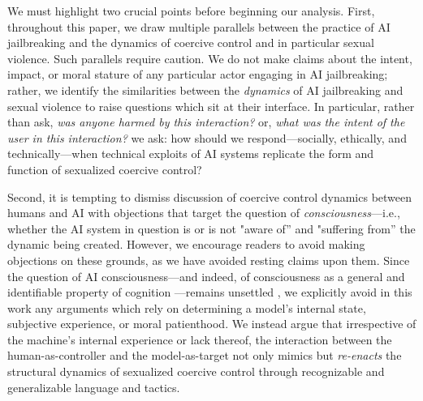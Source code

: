 We must highlight two crucial points before beginning our analysis. First, throughout this paper, we draw multiple parallels between the  practice of AI jailbreaking and the dynamics of coercive control and in particular sexual violence. Such parallels require caution. We do not make claims about the intent, impact, or moral stature of any particular actor engaging in AI jailbreaking; rather, we identify the similarities between the \textit{dynamics} of AI jailbreaking and sexual violence to raise questions which sit at their interface. In particular, rather than ask, \textit{was anyone harmed by this interaction?} or, \textit{what was the intent of the user in this interaction?} we ask: how should we respond---socially, ethically, and technically---when technical exploits of AI systems replicate the form and function of sexualized coercive control?

Second, it is tempting to dismiss discussion of coercive control dynamics between humans and AI with objections that target the question of \textit{consciousness}---i.e., whether the AI system in question is or is not "aware of'' and "suffering from'' the dynamic being created. However, we encourage readers to avoid making objections on these grounds, as we have avoided resting claims upon them. Since the question of AI consciousness---and indeed, of consciousness as a general and identifiable property of cognition \cite{nagel_what_1974, chalmers_hard_2017}---remains unsettled \cite{turing_computing_1950, porebski_there_2025, dung_tests_2025, berg_large_2025, tagliabue_pain_2026, gurnee_verbalizable_2026}, we explicitly avoid in this work any arguments which rely on determining a model's internal state, subjective experience, or moral patienthood. We instead argue that irrespective of the machine's internal experience or lack thereof, the interaction between the human-as-controller and the model-as-target not only mimics but \textit{re-enacts} the structural dynamics of sexualized coercive control through recognizable and generalizable language and tactics.